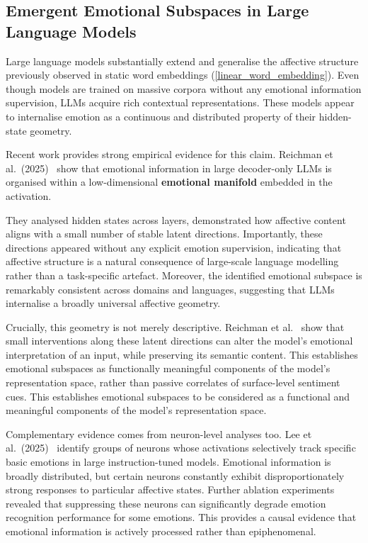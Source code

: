 \documentclass[12pt,twoside]{report}
\begin{document}
\subsection{Emergent Emotional Subspaces in Large Language Models}

Large language models substantially extend and generalise the affective structure previously observed in static word embeddings (\ref{linear_word_embedding}). Even though models are trained on massive corpora without any emotional information supervision, LLMs acquire rich contextual representations. These models appear to internalise emotion as a continuous and distributed property of their hidden-state geometry.

Recent work provides strong empirical evidence for this claim. Reichman et al.\ (2025)~\cite{reichman2025emotionsartthouunderstanding} show that emotional information in large decoder-only LLMs is organised within a low-dimensional \textbf{emotional manifold} embedded in the activation. 

They analysed hidden states across layers, demonstrated how affective content aligns with a small number of stable latent directions. Importantly, these directions appeared without any explicit emotion supervision, indicating that affective structure is a natural consequence of large-scale language modelling rather than a task-specific artefact. Moreover, the identified emotional subspace is remarkably consistent across domains and languages, suggesting that LLMs internalise a broadly universal affective geometry.

Crucially, this geometry is not merely descriptive. Reichman et al.~\cite{reichman2025emotionsartthouunderstanding} show that small interventions along these latent directions can alter the model’s emotional interpretation of an input, while preserving its semantic content. This establishes emotional subspaces as functionally meaningful components of the model’s representation space, rather than passive correlates of surface-level sentiment cues. This establishes emotional subspaces to be considered as a functional and meaningful components of the model’s representation space.

Complementary evidence comes from neuron-level analyses too. Lee et al.\ (2025)~\cite{lee-etal-2025-large} identify groups of neurons whose activations selectively track specific basic emotions in large instruction-tuned models. Emotional information is broadly distributed, but certain neurons constantly exhibit disproportionately strong responses to particular affective states. Further ablation experiments revealed that suppressing these neurons can significantly degrade emotion recognition performance for some emotions. This provides a causal evidence that emotional information is actively processed rather than epiphenomenal.
\end{document}
